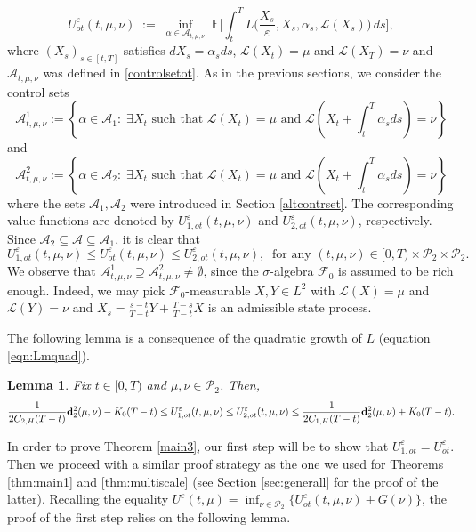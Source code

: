 \documentclass[reqno,11pt]{amsart}
\newtheorem{lemma}[theorem]{Lemma}
\numberwithin{equation}{section}
\newcommand{\be}{\begin{equation}}
\newcommand{\ee}{\end{equation}}
\newcommand{\e}{\varepsilon}
\newcommand{\nd}{\noindent}
\begin{document}
\begin{equation}\nonumber
U_{ot}^\varepsilon(t,\mu,\nu)
\;:=\;
\inf_{\alpha\in\mathcal{A}_{t,\mu,\nu}}\;
\mathbb E\Bigg[\int_t^T L\Big(\frac{X_s}{\varepsilon},X_s,\alpha_s,\mathcal{L}(X_s)\Big)\,ds\Bigg],
\end{equation}
where $(X_s)_{s\in [t,T]}$ satisfies $dX_s=\alpha_s ds$, $\mathcal{L}(X_t)=\mu$ and $\mathcal{L}(X_T)=\nu$ and $\mathcal{A}_{t,\mu,\nu}$ was defined in \eqref{controlsetot}. As in the previous sections, we consider the control sets
$$\mathcal{A}_{t,\mu,\nu}^1:=\left\{ \alpha\in\mathcal{A}_1:\; \exists X_t\text{ such that }\mathcal{L}(X_t)=\mu\text{ and }\mathcal{L}(X_t+\int_t^T\alpha_sds)=\nu \right\}$$
and
$$\mathcal{A}_{t,\mu,\nu}^2:=\left\{ \alpha\in\mathcal{A}_2:\; \exists X_t\text{ such that }\mathcal{L}(X_t)=\mu\text{ and }\mathcal{L}(X_t+\int_t^T\alpha_sds)=\nu \right\}$$
where the sets $\mathcal{A}_1,\mathcal{A}_2$ were introduced in Section \ref{altcontrset}. The corresponding value functions are denoted by $U_{1,ot}^{\e}(t,\mu,\nu)$ and $U_{2,ot}^\e(t,\mu,\nu)$, respectively. Since $\mathcal{A}_2\subseteq \mathcal{A}\subseteq \mathcal{A}_1$, it is clear that
\be\label{eq1001}
U_{1,ot}^{\e}(t,\mu,\nu)\le U_{ot}^{\e}(t,\mu,\nu)\le U_{2,ot}^{\e}(t,\mu,\nu),\;\;\text{for any }(t,\mu,\nu)\in [0,T)\times \mathcal{P}_2\times\mathcal{P}_2.
\ee
We observe that $\mathcal{A}_{t,\mu,\nu}^1\supseteq\mathcal{A}_{t,\mu,\nu}^2\neq\emptyset$, since the $\sigma$-algebra $\mathcal{F}_0$ is assumed to be rich enough. Indeed, we may pick $\mathcal{F}_0$-measurable $X,Y\in L^2$ with $\mathcal{L}(X)=\mu$ and $\mathcal{L}(Y)=\nu$ and $X_s= \frac{s-t}{T-t}Y+\frac{T-s}{T-t}X$ is an admissible state process.\vspace{2mm}

\nd
The following lemma is a consequence of the quadratic growth of $L$ (equation \eqref{eqn:Lmquad}).

\begin{lemma}\label{naive estimate}
Fix $t\in [0,T)$ and $\mu,\nu\in \mathcal{P}_2$. Then,
$$\frac{1}{2C_{2,H}(T-t)}{\bf d}_2^2(\mu,\nu)-K_0(T-t)\le U_{1,ot}^\e(t,\mu,\nu)\le U_{2,ot}^\e(t,\mu,\nu) \le \frac{1}{2C_{1,H}(T-t)}{\bf d}_2^2(\mu,\nu)+K_0(T-t).$$
\end{lemma}
\vspace{3mm}

\nd
In order to prove Theorem \ref{main3}, our first step will be to show that $U^\e_{1,ot}=U^\e_{ot}$. Then we proceed with a similar proof strategy as the one we used for Theorems \ref{thm:main1} and \ref{thm:multiscale} (see Section \ref{sec:generall} for the proof of the latter). Recalling the equality $U^\e(t,\mu)=\inf_{\nu\in \mathcal{P}_2}\{ U^\e_{ot}(t,\mu,\nu)+G(\nu)\}$, the proof of the first step relies on the following lemma.
\end{document}
